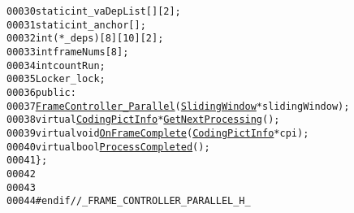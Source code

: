 \begin{footnotesize}
\begin{alltt}
00030         \textcolor{keyword}{static} \textcolor{keywordtype}{int} \_vaDepList[][2];
00031         \textcolor{keyword}{static} \textcolor{keywordtype}{int} \_anchor[];
00032         int (*\_deps)[8][10][2];
00033         \textcolor{keywordtype}{int} frameNums[8];
00034         \textcolor{keywordtype}{int} countRun;
00035         Locker \_lock;
00036 \textcolor{keyword}{public}:
00037         \hyperlink{class_frame_controller___parallel_a5e258e822b7cea0eb61e02b28a7f0db7}{FrameController_Parallel}(\hyperlink{class_sliding_window}{SlidingWindow} *slidingWindow);
00038         \textcolor{keyword}{virtual} \hyperlink{struct_coding_pict_info}{CodingPictInfo} *\hyperlink{class_frame_controller___parallel_a51792b5fe70db6d99be59c110dbc3041}{GetNextProcessing}();
00039         \textcolor{keyword}{virtual} \textcolor{keywordtype}{void} \hyperlink{class_frame_controller___parallel_a26429e70ddf3aa68cc2d28000a4935e1}{OnFrameComplete}(\hyperlink{struct_coding_pict_info}{CodingPictInfo} *cpi);
00040         \textcolor{keyword}{virtual} \textcolor{keywordtype}{bool} \hyperlink{class_frame_controller___parallel_ac778eb523c6725a9e4da4e4239a88b2a}{ProcessCompleted}();
00041 \};
00042 
00043 
00044 \textcolor{preprocessor}{#endif //\_FRAME\_CONTROLLER\_PARALLEL\_H\_}
\end{alltt}\end{footnotesize}
